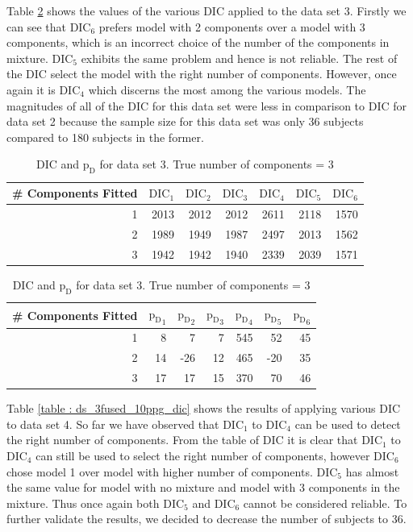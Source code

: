 Table \ref{table : ds_3wellsep_3ppg_dic} shows the values of the various DIC applied to the data set 3. Firstly we can see that $\text{DIC}_6$ prefers model with 2 components over a model with 3 components, which is an incorrect choice of the number of the components in mixture. $\text{DIC}_5$ exhibits the same problem and hence is not reliable. The rest of the DIC select the model with the right number of components. However, once again it is $\text{DIC}_4$ which discerns the most among the various models. The magnitudes of all of the DIC for this data set were less in comparison to DIC for data set 2 because the sample size for this data set was only 36 subjects compared to 180 subjects in the former.\\

\begin{table}[!htb]
\centering
\captionsetup{justification=centering}
\caption{DIC and $\text{p}_\text{D}$ for data set 3. True number of components = 3}
\label{table : ds_3wellsep_3ppg_dic}
\begin{tabular}{@{}rrrrrrr@{}}
\toprule
\# Components Fitted & $\text{DIC}_1$ & $\text{DIC}_2$  & $\text{DIC}_3$  & $\text{DIC}_4$  & $\text{DIC}_5$  & $\text{DIC}_6$  \\ \midrule
1 & 2013 & 2012 & 2012 & 2611 & 2118 & 1570 \\
2 & 1989 & 1949 & 1987 & 2497 & 2013 & 1562 \\
3 & 1942 & 1942 & 1940 & 2339 & 2039 & 1571 \\
\bottomrule
\end{tabular}

\begin{tabular}{@{}rrrrrrr@{}}
\toprule
\# Components Fitted & ${\text{p}_\text{D}}_1$ & ${\text{p}_\text{D}}_2$ & ${\text{p}_\text{D}}_3$ & ${\text{p}_\text{D}}_4$ & ${\text{p}_\text{D}}_5$ & ${\text{p}_\text{D}}_6$ \\ \midrule
1 & 8 & 7 & 7 & 545 & 52 & 45 \\
2 & 14 & -26 & 12 & 465 & -20 & 35 \\
3 & 17 & 17 & 15 & 370 & 70 & 46 \\
\bottomrule
\end{tabular}
\end{table}

Table \ref{table : ds_3fused_10ppg_dic} shows the results of applying various DIC to data set 4. So far we have observed that $\text{DIC}_1$ to $\text{DIC}_4$ can be used to detect the right number of components. From the table of DIC it is clear that $\text{DIC}_1$ to $\text{DIC}_4$ can still be used to select the right number of components, however $\text{DIC}_6$ chose model 1 over model with higher number of components. $\text{DIC}_5$ has almost the same value for model with no mixture and model with 3 components in the mixture. Thus once again both $\text{DIC}_5$ and  $\text{DIC}_6$ cannot be considered reliable. To further validate the results, we decided to decrease the number of subjects to 36.\\
 
